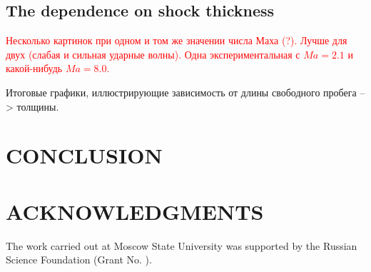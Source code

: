 \documentclass{aip-cp}
\begin{document}
\subsection{The dependence on shock thickness}

\textcolor{red}{Несколько картинок при одном и том же значении числа Маха (?). Лучше для двух (слабая и сильная ударные волны). Одна экспериментальная с $Ma=2.1$ и какой-нибудь $Ma=8.0$.}

Итоговые графики, иллюстрирующие зависимость от длины свободного пробега --> толщины.

\section{CONCLUSION}

\section{ACKNOWLEDGMENTS}
The work carried out at Moscow State University was supported by the Russian Science Foundation (Grant No. ).


\nocite{*}
%
%
\end{document}
